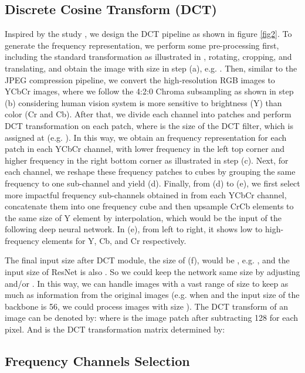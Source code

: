 \documentclass[10pt, conference, compsocconf]{IEEEtran}
\begin{document}
\subsection{Discrete Cosine Transform (DCT)}

Inspired by the study \cite{XuKai2020}, we design the DCT pipeline as shown in figure \ref{fig2}. To generate the frequency representation, we perform some pre-processing first, including the standard transformation as illustrated in \cite{krizhevsky2017imagenet}, rotating, cropping, and translating, and obtain the image with size  in step (a), e.g. . Then, similar to the JPEG compression pipeline, we convert the high-resolution RGB images to YCbCr images, where we follow the 4:2:0 Chroma subsampling as shown in step (b) considering human vision system is more sensitive to brightness (Y) than color (Cr and Cb). After that, we divide each channel into  patches and perform  DCT transformation on each patch, where  is the size of the DCT filter, which is assigned at (e.g. ). In this way, we obtain an  frequency representation for each  patch in each YCbCr channel, with lower frequency in the left top corner and higher frequency in the right bottom corner as illustrated in step (c). Next, for each channel, we reshape these  frequency patches to cubes by grouping the same frequency to one sub-channel and yield (d). Finally, from (d) to (e), we first select more impactful frequency sub-channels {}{obtained in} \cite{XuKai2020} from each YCbCr channel, concatenate them into one frequency cube and then upsample CrCb elements to the same size of Y element by interpolation, which would be the input of the following deep neural network. In (e), from left to right, it shows low to high-frequency elements for Y, Cb, and Cr respectively. 

The final input size after DCT module, the size of (f), would be , e.g. , and the input size of ResNet is also . So we could keep the network same size by adjusting  and/or . In this way, we can handle images with a vast range of size to keep as much as information from the original images (e.g. when  and the input size of the backbone is 56, we could process images with size ).  The DCT transform of an image can be denoted by:  
\noindent
where  is the  image patch after subtracting 128 for each pixel. And  is the DCT transformation matrix determined by:


\subsection{Frequency Channels Selection}
\end{document}
